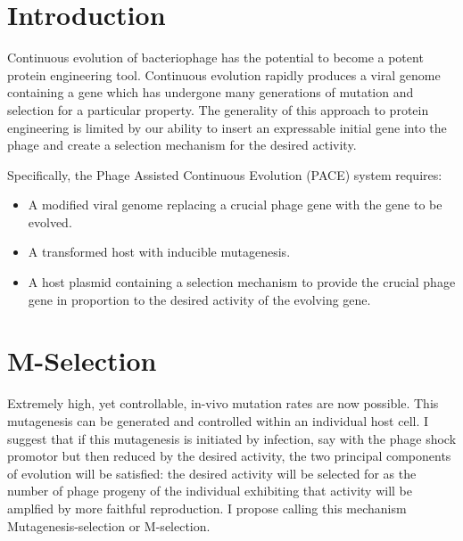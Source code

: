 \documentclass[10pt,letterpaper]{article}
\begin{document}


\section*{Introduction}
Continuous evolution of bacteriophage has the potential to become a potent protein engineering tool\cite{pace}\cite{monsanto}.
Continuous evolution rapidly produces a viral genome containing a gene
which has undergone many generations of mutation and selection for
a particular property.  The generality of this approach to protein engineering
is limited by our ability to insert an expressable initial gene into the phage and create a selection mechanism for the desired activity.

Specifically, the Phage Assisted Continuous Evolution (PACE)\cite{pace} system requires:
\begin{itemize}

\item{}
A modified viral genome replacing a crucial phage gene with the gene to be evolved.

\item{}
A transformed host with inducible mutagenesis.

\item{}
A host plasmid containing a selection mechanism to provide the crucial phage gene in proportion to the desired activity of the evolving gene.
\end{itemize}

\section{M-Selection}
Extremely high, yet controllable, in-vivo mutation rates are now possible\cite{mutation}.  This mutagenesis can be generated and controlled within an individual host cell.  I suggest that if this mutagenesis is initiated  by infection, say with the phage shock promotor but then reduced by the desired activity, the two principal components of evolution will be satisfied: the desired activity will be selected for as the number of phage progeny of the individual exhibiting that activity will be amplfied by more faithful reproduction.  I propose calling this mechanism Mutagenesis-selection or M-selection.
\end{document}
